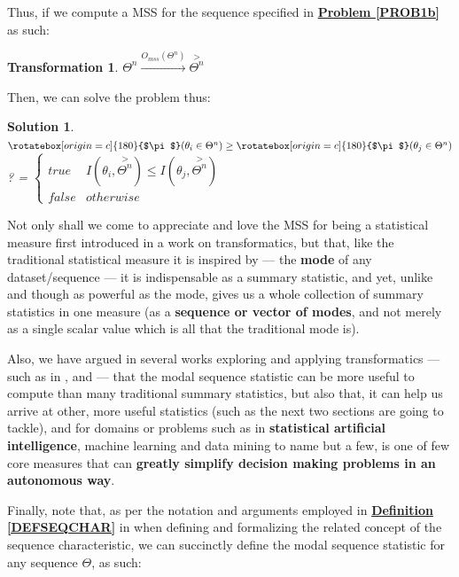\documentclass[a4paper, 18pt]{book} %
\newtheorem{trans}{Transformation}
\newtheorem{soln}{Solution}
\newcommand{\invpi}{\rotatebox[origin=c]{180}{$\pi$}}
\begin{document}
\begin{appendices}
Thus, if we compute a MSS for the sequence specified in \textbf{\hyperref[PROB1b]{Problem \ref{PROB1b}}} as such:

\vspace{1em}
\begin{trans}
$\Theta^n \xrightarrow{O_{mss}(\Theta^n)} \overset{>}{\Theta^n}$
\end{trans}
\vspace{1em}

Then, we can solve the problem thus:

\vspace{1em}
\begin{soln}
\label{SOLN1b}
$\invpi(\theta_i \in \Theta^n) \geq \invpi(\theta_j \in \Theta^n)$? = 
$\begin{cases}
true & I(\theta_i,\overset{>}{\Theta^n}) \leq I(\theta_j,\overset{>}{\Theta^n})\\
false & otherwise
\end{cases}$
\end{soln}
\vspace{1em}


Not only shall we come to appreciate and love the MSS for being a statistical measure first introduced in a work on transformatics\cite{transformatics}, but that, like the traditional statistical measure it is inspired by --- the \textbf{mode} of any dataset/sequence --- it is indispensable as a summary statistic, and yet, unlike and though as powerful as the mode, gives us a whole collection of summary statistics in one measure (as a \textbf{sequence or vector of modes}, and not merely as a single scalar value which is all that the traditional mode is). 

Also, we have argued in several works exploring and applying transformatics --- such as in \cite{transformatics}, \cite{adtpaper} and \cite{lutalo_2025_trans_genetics} --- that the modal sequence statistic can be more useful to compute than many traditional summary statistics, but also that, it can help us arrive at other, more useful statistics (such as the next two sections are going to tackle), and for domains or problems such as in \textbf{statistical artificial intelligence}, machine learning and data mining to name but a few, is one of few core measures that can \textbf{greatly simplify decision making problems in an autonomous way}.



Finally, note that, as per the notation and arguments employed in \textbf{\hyperref[DEFSEQCHAR]{Definition \ref{DEFSEQCHAR}}} in \cite{lutalo_2025_trans_genetics} when defining and formalizing the related concept of the sequence characteristic, we can succinctly define the modal sequence statistic for any sequence $\Theta$, as such:


\end{appendices}
\end{document}
